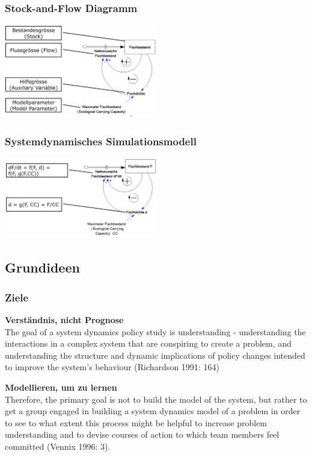 \begin{multicols}{2}
	\subsubsection{Stock-and-Flow Diagramm}
	\includegraphics[width=0.5\textwidth]{pictures/stock_and_flow_diagramm}
	
	\subsubsection{Systemdynamisches Simulationsmodell}
	\includegraphics[width=0.5\textwidth]{pictures/systemdynamisches_simulationsmodell}
\end{multicols}	

\subsection{Grundideen}
\subsubsection{Ziele}
\begin{compactitem}
	\item \textbf{Verständnis, nicht Prognose} \\
	The goal of a system dynamics policy study is understanding - understanding the interactions in a complex system that are 	conspiring to create a problem, and understanding the structure	and dynamic implications of policy changes intended to improve	the system's behaviour (Richardson 1991: 164)
	\item \textbf{Modellieren, um zu lernen} \\
	Therefore, the primary goal is not to build the model of the system, but rather to get a group engaged in building a system dynamics model of a problem in order to see to what	extent this process might be helpful to increase problem understanding and to devise courses of action to which team members feel committed (Vennix 1996: 3).
\end{compactitem}

